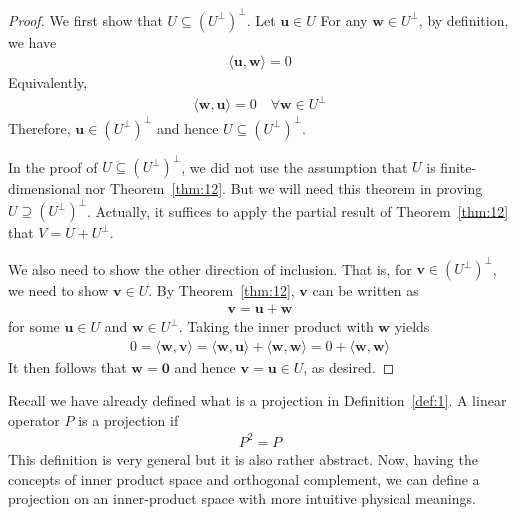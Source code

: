\documentclass[thmcnt=section, color=blue, 12pt]{my-elegantbook}
\begin{document}
\begin{proof}
	We first show that $U \subseteq (U^\perp)^\perp$.
	Let $\mathbf{u} \in U$
	For any $\mathbf{w} \in U^\perp$,
	by definition, we have 
	\begin{align*}
		\langle \mathbf{u}, \mathbf{w} \rangle = 0
	\end{align*}
	Equivalently,
	\begin{align*}
		\langle \mathbf{w}, \mathbf{u} \rangle = 0
		\quad
		\forall \mathbf{w} \in U^\perp
	\end{align*}
	Therefore, $\mathbf{u} \in (U^\perp)^\perp$ 
	and hence $U \subseteq (U^\perp)^\perp$.
	\begin{note}
		In the proof of $U \subseteq (U^\perp)^\perp$,
		we did not use the assumption that $U$ is finite-dimensional
		nor Theorem~\ref{thm:12}.
		But we will need this theorem 
		in proving $U \supseteq (U^\perp)^\perp$.
		Actually, it suffices to apply 
		the partial result of Theorem~\ref{thm:12}
		that $V = U + U^\perp$.
	\end{note}

	We also need to show the other direction of inclusion.
	That is, for $\mathbf{v} \in (U^\perp)^\perp$,
	we need to show $\mathbf{v} \in U$.
	By Theorem~\ref{thm:12}, $\mathbf{v}$ can be written as 
	\begin{align*}
		\mathbf{v} = \mathbf{u} + \mathbf{w}
	\end{align*}
	for some $\mathbf{u} \in U$ and $\mathbf{w} \in U^\perp$.
	Taking the inner product with $\mathbf{w}$ yields
	\begin{align*}
		0
		= \langle \mathbf{w}, \mathbf{v} \rangle
		= \langle \mathbf{w}, \mathbf{u} \rangle
		+ \langle \mathbf{w}, \mathbf{w} \rangle 
		= 0 + \langle \mathbf{w}, \mathbf{w} \rangle
	\end{align*}
	It then follows that $\mathbf{w} = \mathbf{0}$
	and hence $\mathbf{v} = \mathbf{u} \in U$, as desired.
\end{proof}


Recall we have already defined what is a projection 
in Definition~\ref{def:1}. 
A linear operator $P$ is a projection if
\begin{align*}
	P^2 = P
\end{align*}
This definition is very general but it is also rather abstract.
Now, having the concepts of inner product space and orthogonal complement,
we can define a projection on an inner-product space with more intuitive
physical meanings.
\end{document}
